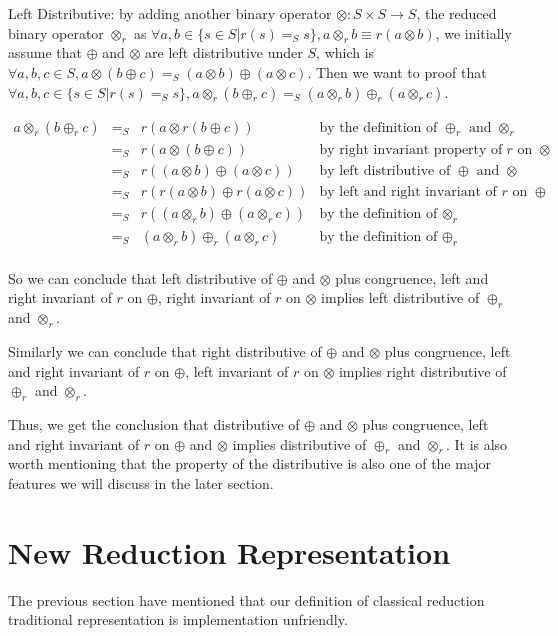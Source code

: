 \documentclass[a4paper,12pt,twoside,openright]{report}
\newcommand{\e}[2]{
\begin{equation}
  \label{#1} 
  #2
\end{equation}
}
\begin{document}
Left Distributive: by adding another binary operator $\otimes : S \times S \rightarrow S$, the reduced binary operator $\otimes_r$ as $\forall a,b \in \{s \in S | r(s) =_S s\}, a \otimes_r b \equiv r(a \otimes b)$, we initially assume that $\oplus$ and $\otimes$ are left distributive under $S$, which is $\forall a,b,c \in S, a \otimes (b \oplus c) =_S (a \otimes b) \oplus (a \otimes c)$. Then we want to proof that $\forall a,b,c \in \{s \in S | r(s) =_S s\}, a \otimes_r (b \oplus_r c) =_S (a \otimes_r b) \oplus_r (a \otimes_r c)$. 
\e{r:proof:left_distributive}{
\begin{array}{rcll} 
a \otimes_r (b \oplus_r c) & =_S & r(a \otimes r(b \oplus c)) &\mbox{by the definition of $\oplus_r$ and $\otimes_r$} \\
			 & =_S & r(a \otimes (b \oplus c)) &\mbox{by right invariant property of $r$ on $\otimes$}\\
			 & =_S & r((a \otimes b) \oplus (a \otimes c)) &\mbox{by left distributive of $\oplus$ and $\otimes$}\\
			 & =_S & r(r(a \otimes b) \oplus r(a \otimes c)) &\mbox{by left and right invariant of $r$ on $\oplus$}\\			 
			 & =_S & r((a \otimes_r b) \oplus (a \otimes_r c)) &\mbox{by the definition of $\otimes_r$}\\
             & =_S & (a \otimes_r b) \oplus_r (a \otimes_r c)  &\mbox{by the definition of $\oplus_r$} \\
\end{array}}
So we can conclude that left distributive of $\oplus$ and $\otimes$ plus congruence, left and right invariant of $r$ on $\oplus$, right invariant of $r$ on $\otimes$ implies left distributive of $\oplus_r$ and $\otimes_r$.

Similarly we can conclude that right distributive of $\oplus$ and $\otimes$ plus congruence, left and right invariant of $r$ on $\oplus$, left invariant of $r$ on $\otimes$ implies right distributive of $\oplus_r$ and $\otimes_r$.

Thus, we get the conclusion that distributive of $\oplus$ and $\otimes$ plus congruence, left and right invariant of $r$ on $\oplus$ and $\otimes$ implies distributive of $\oplus_r$ and $\otimes_r$.
It is also worth mentioning that the property of the distributive is also one of the major features we will discuss in the later section.

\section{New Reduction Representation}
The previous section have mentioned that our definition of classical reduction traditional representation is implementation unfriendly.
\end{document}
